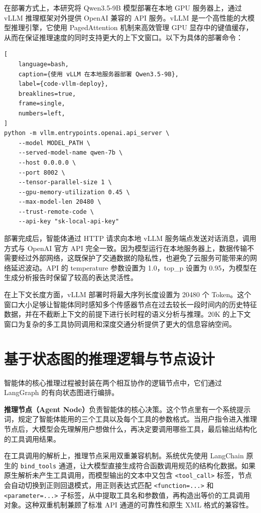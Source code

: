在部署方式上，本研究将 Qwen3.5-9B 模型部署在本地 GPU 服务器上，通过 vLLM 推理框架对外提供 OpenAI 兼容的 API 服务。vLLM 是一个高性能的大模型推理引擎，它使用 PagedAttention 机制来高效管理 GPU 显存中的键值缓存，从而在保证推理速度的同时支持更大的上下文窗口。以下为具体的部署命令：

\begin{lstlisting}[
    language=bash,
    caption={使用 vLLM 在本地服务器部署 Qwen3.5-9B},
    label={code-vllm-deploy},
    breaklines=true,
    frame=single,
    numbers=left,
]
python -m vllm.entrypoints.openai.api_server \
    --model MODEL_PATH \
    --served-model-name qwen-7b \
    --host 0.0.0.0 \
    --port 8002 \
    --tensor-parallel-size 1 \
    --gpu-memory-utilization 0.45 \
    --max-model-len 20480 \
    --trust-remote-code \
    --api-key "sk-local-api-key"
\end{lstlisting}

部署完成后，智能体通过 HTTP 请求向本地 vLLM 服务端点发送对话消息，调用方式与 OpenAI 官方 API 完全一致。因为模型运行在本地服务器上，数据传输不需要经过外部网络，这既保护了交通数据的隐私性，也避免了云服务可能带来的网络延迟波动。API 的 temperature 参数设置为 1.0，top\_p 设置为 0.95，为模型在生成分析报告时保留了较高的表达灵活性。

在上下文长度方面，vLLM 部署时将最大序列长度设置为 20480 个 Token。这个窗口大小足够让智能体同时感知多个传感器节点在过去较长一段时间内的历史特征数据，并在不截断上下文的前提下进行长时程的语义分析与推理。20K 的上下文窗口为复杂的多工具协同调用和深度交通分析提供了更大的信息容纳空间。

\section{基于状态图的推理逻辑与节点设计}

智能体的核心推理过程被封装在两个相互协作的逻辑节点中，它们通过 LangGraph 的有向状态图进行编排。

\textbf{推理节点（Agent Node）}负责智能体的核心决策。这个节点里有一个系统提示词，规定了智能体能用的三个工具以及每个工具的参数格式。当用户指令进入推理节点后，大模型会先理解用户想做什么，再决定要调用哪些工具，最后输出结构化的工具调用结果。

在工具调用的解析上，推理节点采用双重兼容机制。系统优先使用 LangChain 原生的 \texttt{bind\_tools} 通道，让大模型直接生成符合函数调用规范的结构化数据。如果原生解析未产生工具调用，而模型输出的文本中又包含 \texttt{<tool\_call>} 标签，节点会自动切换到正则回退模式，用正则表达式匹配 \texttt{<function=...>} 和 \texttt{<parameter=...>} 子标签，从中提取工具名和参数值，再构造出等价的工具调用对象。这种双重机制兼顾了标准 API 通道的可靠性和原生 XML 格式的兼容性。

